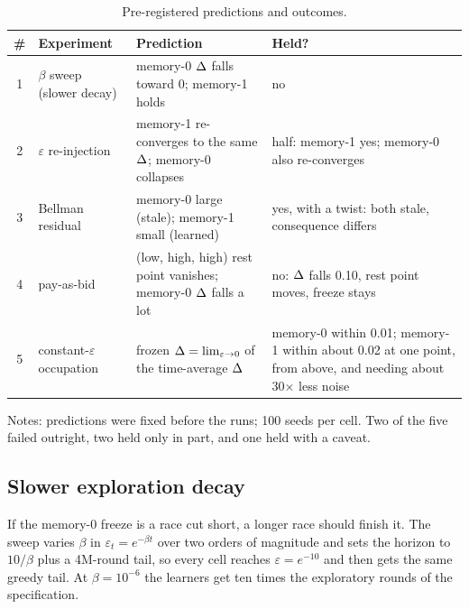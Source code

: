 \begin{table}[htbp]
\centering
\caption{Pre-registered predictions and outcomes.}
\label{tab:predictions}
\small
\begin{tabular}{@{}clp{5.6cm}p{4.6cm}@{}}
\toprule
\# & Experiment & Prediction & Held? \\
\midrule
1 & $\beta$ sweep (slower decay) & memory-0 $\Delta$ falls toward 0; memory-1 holds & no \\
2 & $\varepsilon$ re-injection & memory-1 re-converges to the same $\Delta$; memory-0 collapses & half: memory-1 yes; memory-0 also re-converges \\
3 & Bellman residual & memory-0 large (stale); memory-1 small (learned) & yes, with a twist: both stale, consequence differs \\
4 & pay-as-bid & (low, high, high) rest point vanishes; memory-0 $\Delta$ falls a lot & no: $\Delta$ falls 0.10, rest point moves, freeze stays \\
5 & constant-$\varepsilon$ occupation & frozen $\Delta = \lim_{\varepsilon\to 0}$ of the time-average $\Delta$ & memory-0 within 0.01; memory-1 within about 0.02 at one point, from above, and needing about 30$\times$ less noise \\
\bottomrule
\end{tabular}
\par\smallskip
\footnotesize Notes: predictions were fixed before the runs; 100 seeds per cell. Two of the five failed outright, two held only in part, and one held with a caveat.
\end{table}

\subsection{Slower exploration decay}\label{sec:beta}

If the memory-0 freeze is a race cut short, a longer race should finish it. The sweep varies $\beta$ in $\varepsilon_t = e^{-\beta t}$ over two orders of magnitude and sets the horizon to $10/\beta$ plus a 4M-round tail, so every cell reaches $\varepsilon = e^{-10}$ and then gets the same greedy tail. At $\beta = 10^{-6}$ the learners get ten times the exploratory rounds of the specification.

